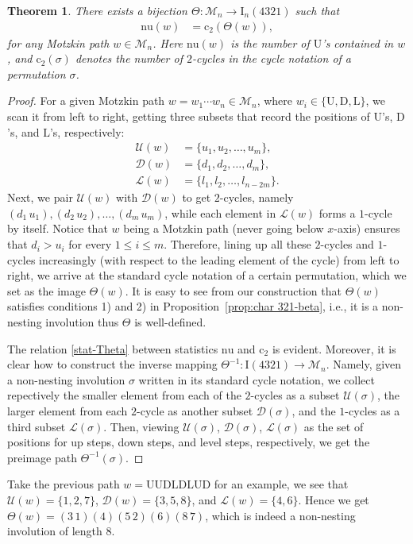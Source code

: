 \documentclass[12pt]{amsart}
\numberwithin{equation}{section}
\theoremstyle{plain}
\newtheorem{theorem}{Theorem}[section]
\def\cM{\mathcal{M}}
\def\rU{\mathrm{U}}
\def\rL{\mathrm{L}}
\def\rD{\mathrm{D}}
\def\cU{\mathcal{U}}
\def\cL{\mathcal{L}}
\def\cD{\mathcal{D}}
\def\rI{\mathrm{I}}
\def\cc{\mathrm{c}_2}
\def\nou{\mathrm{nu}}
\begin{document}
\begin{theorem}\label{thm:Motzkin and nonnesting involution}
There exists a bijection $\Theta:\cM_n\to \rI_n(4321)$ such that
\begin{align}\label{stat-Theta}
	\nou(w) &= \cc(\Theta(w)),
\end{align}
for any Motzkin path $w\in\cM_n$. Here $\nou(w)$ is the number of $\rU$'s contained in $w$, and $\cc(\sigma)$ denotes the number of $2$-cycles in the cycle notation of a permutation $\sigma$.
\end{theorem}
\begin{proof}
For a given Motzkin path $w=w_1\cdots w_n\in\cM_n$, where $w_i\in\{\rU,\rD,\rL\}$, we scan it from left to right, getting three subsets that record the positions of $\rU$'s, $\rD$'s, and $\rL$'s, respectively:
\begin{align*}
	\cU(w) &= \{u_1,u_2,\ldots,u_m\},\\
	\cD(w) &= \{d_1,d_2,\ldots,d_m\},\\
	\cL(w) &= \{l_1,l_2,\ldots,l_{n-2m}\}.
\end{align*}
Next, we pair $\cU(w)$ with $\cD(w)$ to get $2$-cycles, namely $(d_1\,u_1),(d_2\,u_2),\ldots,(d_m\,u_m)$, while each element in $\cL(w)$ forms a $1$-cycle by itself. Notice that $w$ being a Motzkin path (never going below $x$-axis) ensures that $d_i>u_i$ for every $1\le i\le m$. Therefore, lining up all these $2$-cycles and $1$-cycles increasingly (with respect to the leading element of the cycle) from left to right, we arrive at the standard cycle notation of a certain permutation, which we set as the image $\Theta(w)$. It is easy to see from our construction that $\Theta(w)$ satisfies conditions 1) and 2) in Proposition~\ref{prop:char 321-beta}, i.e., it is a non-nesting involution thus $\Theta$ is well-defined. 

The relation \eqref{stat-Theta} between statistics $\nou$ and $\cc$ is evident. Moreover, it is clear how to construct the inverse mapping $\Theta^{-1}:\rI(4321)\to \cM_n$. Namely, given a non-nesting involution $\sigma$ written in its standard cycle notation, we collect repectively the smaller element from each of the $2$-cycles as a subset $\cU(\sigma)$, the larger element from each $2$-cycle as another subset $\cD(\sigma)$, and the $1$-cycles as a third subset $\cL(\sigma)$. Then, viewing $\cU(\sigma)$, $\cD(\sigma)$, $\cL(\sigma)$ as the set of positions for up steps, down steps, and level steps, respectively, we get the preimage path $\Theta^{-1}(\sigma)$.
\end{proof}
Take the previous path $w=\rU\rU\rD\rL\rD\rL\rU\rD$ for an example, we see that $\cU(w)=\{1,2,7\}$, $\cD(w)=\{3,5,8\}$, and $\cL(w)=\{4,6\}$. Hence we get $\Theta(w)=(3\,1)(4)(5\,2)(6)(8\,7)$, which is indeed a non-nesting involution of length $8$.
\end{document}
